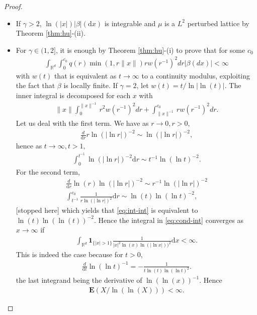 \documentclass[12pt]{article}
\newcommand{\1}{\mathbf{1}}
\newcommand{\md}{\mathrm{d}}
\begin{document}
{{{{{\begin{proof}
\begin{itemize}
\item  If $\gamma  >2$, $ \ln( | x | ) | \beta  |(\md x) $ is integrable and $ \mu $ is a $ L^{2}$ perturbed lattice by Theorem \ref{thm:hu}-(ii).
\item
 {For $\gamma \in (1,2]$, it is enough by Theorem \ref{thm:hu}-(i) to prove that for some $c_{0}$
\begin{align*}
\int_{  \mathbb R  ^{d}}\int_{0}^{c_{0}}  {q(r)}\min(1,r\|x\|)rw(r^{-1})^{2}dr| \beta (dx)| <\infty
\end{align*}with
 $w(t)$ that is  equivalent as $t\to \infty $  to a continuity modulus, exploiting the fact that $\beta $ is locally finite.}
If $ \gamma  = 2$, let $ w(t) = t/\ln | \ln(t) | .$ The inner integral is decomposed for each $x$ with
\begin{align*}
\|x\|\int_{0}^{\|x\|^{-1}}r^{2}w(r^{-1})^{2}dr+\int_{\|x\|^{-1}}^{c_{0}}rw(r^{-1})^{2}dr.
\end{align*} Let us deal with the first term. We have as $ r\to 0,r>0$,
\begin{align*}
\frac{ d}{\md r}r\ln(|\ln r|)^{-2}\sim \ln(|\ln r|)^{-2},
\end{align*}hence as $ t \to \infty,t>1 ,$
\begin{align*}\int_{0}^{t^{- 1}}\ln( | \ln r | )^{-2}\md r\sim t^{- 1}\ln(   \ln t   )^{-2}.
\end{align*}
 {For the second term,}
\begin{align*}
\frac{ d}{\md r}\ln(r)\ln(|\ln r|)^{-2}\sim r^{- 1}\ln(|\ln r|)^{-2}\\
\int_{  t^{- 1}}^{c_{0}}\frac{  1}{r\ln( | \ln r | )^{2}}\md r\sim \ln(t)\ln(   \ln t  )^{-2},
\end{align*}  {[stopped here]}
which yields that  \eqref{eq:int-int} is equivalent to  $   \ln(t)\ln(\ln(t))^{- 2}$. Hence the integral in \eqref{eq:cond-int} converges as $x\to \infty $ if
\begin{align*}
  \int_{\mathbb{R}^{d}}\mathbf{1}_{\{ | x | > 1\}}  \frac{ 1}{ | x | ^{2} \ln(x)\ln( | \ln x | ))^{2}}\md x<\infty    .
\end{align*}
This is indeed the case because for $ t>0$,
\begin{align*}\frac{ d}{\md t}\ln( \ln t  )^{- 1} =  -\frac{  1}{t\ln(t)\ln(\ln t)^{2}}.
\end{align*}
the last integrand being  the derivative of $ \ln(\ln(x))^{- 1}.$ Hence
\begin{align*}\mathbf{E}(X/\ln(\ln(X)))<\infty .
\end{align*}

\end{itemize}
\end{proof}}}}}}
\end{document}

